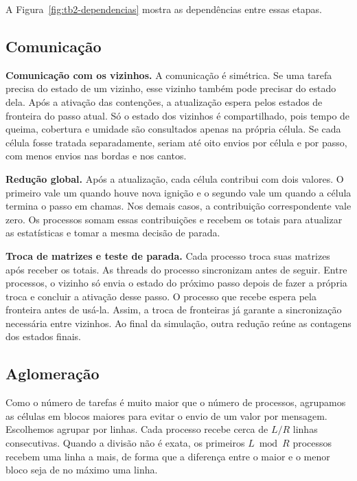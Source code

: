 \documentclass[12pt,a4paper]{article}
\begin{document}
A Figura~\ref{fig:tb2-dependencias} mostra as dependências entre essas etapas.



\subsection{Comunicação}

\textbf{Comunicação com os vizinhos.} A comunicação é simétrica. Se uma tarefa precisa do estado de um vizinho, esse vizinho também pode precisar do estado dela. Após a ativação das contenções, a atualização espera pelos estados de fronteira do passo atual. Só o estado dos vizinhos é compartilhado, pois tempo de queima, cobertura e umidade são consultados apenas na própria célula. Se cada célula fosse tratada separadamente, seriam até oito envios por célula e por passo, com menos envios nas bordas e nos cantos.

\textbf{Redução global.} Após a atualização, cada célula contribui com dois valores. O primeiro vale um quando houve nova ignição e o segundo vale um quando a célula termina o passo em chamas. Nos demais casos, a contribuição correspondente vale zero. Os processos somam essas contribuições e recebem os totais para atualizar as estatísticas e tomar a mesma decisão de parada.

\textbf{Troca de matrizes e teste de parada.} Cada processo troca suas matrizes após receber os totais. As threads do processo sincronizam antes de seguir. Entre processos, o vizinho só envia o estado do próximo passo depois de fazer a própria troca e concluir a ativação desse passo. O processo que recebe espera pela fronteira antes de usá-la. Assim, a troca de fronteiras já garante a sincronização necessária entre vizinhos. Ao final da simulação, outra redução reúne as contagens dos estados finais.

\subsection{Aglomeração}

Como o número de tarefas é muito maior que o número de processos, agrupamos as células em blocos maiores para evitar o envio de um valor por mensagem. Escolhemos agrupar por linhas. Cada processo recebe cerca de $L/R$ linhas consecutivas. Quando a divisão não é exata, os primeiros $L \bmod R$ processos recebem uma linha a mais, de forma que a diferença entre o maior e o menor bloco seja de no máximo uma linha.
\end{document}

